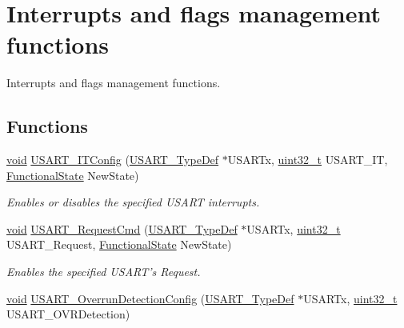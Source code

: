 \hypertarget{group___u_s_a_r_t___group12}{\section{Interrupts and flags management functions}
\label{group___u_s_a_r_t___group12}
}


Interrupts and flags management functions.  


\subsection*{Functions}
\begin{DoxyCompactItemize}
\item 
\hyperlink{group___n_a_m_e_ga18028b8badbf1ea7e704ccac3c488e82}{void} \hyperlink{group___u_s_a_r_t___group12_ga70b4cd986edab929e38ac6a427492b7c}{U\-S\-A\-R\-T\-\_\-\-I\-T\-Config} (\hyperlink{struct_u_s_a_r_t___type_def}{U\-S\-A\-R\-T\-\_\-\-Type\-Def} $\ast$U\-S\-A\-R\-Tx, \hyperlink{stdint_8h_a435d1572bf3f880d55459d9805097f62}{uint32\-\_\-t} U\-S\-A\-R\-T\-\_\-\-I\-T, \hyperlink{group___exported__types_gac9a7e9a35d2513ec15c3b537aaa4fba1}{Functional\-State} New\-State)
\begin{DoxyCompactList}\small\item\em Enables or disables the specified U\-S\-A\-R\-T interrupts. \end{DoxyCompactList}\item 
\hyperlink{group___n_a_m_e_ga18028b8badbf1ea7e704ccac3c488e82}{void} \hyperlink{group___u_s_a_r_t___group12_ga9cb3c0fb4f745d1c80481f17a0e73e16}{U\-S\-A\-R\-T\-\_\-\-Request\-Cmd} (\hyperlink{struct_u_s_a_r_t___type_def}{U\-S\-A\-R\-T\-\_\-\-Type\-Def} $\ast$U\-S\-A\-R\-Tx, \hyperlink{stdint_8h_a435d1572bf3f880d55459d9805097f62}{uint32\-\_\-t} U\-S\-A\-R\-T\-\_\-\-Request, \hyperlink{group___exported__types_gac9a7e9a35d2513ec15c3b537aaa4fba1}{Functional\-State} New\-State)
\begin{DoxyCompactList}\small\item\em Enables the specified U\-S\-A\-R\-T's Request. \end{DoxyCompactList}\item 
\hyperlink{group___n_a_m_e_ga18028b8badbf1ea7e704ccac3c488e82}{void} \hyperlink{group___u_s_a_r_t___group12_gae671cf8fe0eed14d44c1c2c932854754}{U\-S\-A\-R\-T\-\_\-\-Overrun\-Detection\-Config} (\hyperlink{struct_u_s_a_r_t___type_def}{U\-S\-A\-R\-T\-\_\-\-Type\-Def} $\ast$U\-S\-A\-R\-Tx, \hyperlink{stdint_8h_a435d1572bf3f880d55459d9805097f62}{uint32\-\_\-t} U\-S\-A\-R\-T\-\_\-\-O\-V\-R\-Detection)

\end{DoxyCompactItemize}
